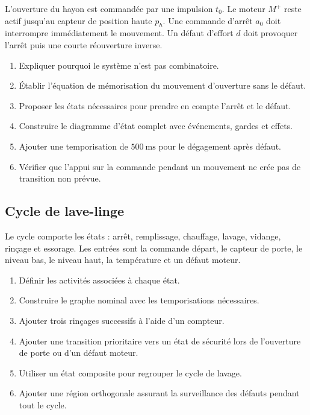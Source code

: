 L'ouverture du hayon est commandée par une impulsion $t_0$. Le moteur $M^+$ reste actif jusqu'au capteur de position haute $p_h$. Une commande d'arrêt $a_0$ doit interrompre immédiatement le mouvement. Un défaut d'effort $d$ doit provoquer l'arrêt puis une courte réouverture inverse.

\begin{enumerate}
  \item Expliquer pourquoi le système n'est pas combinatoire.
  \item Établir l'équation de mémorisation du mouvement d'ouverture sans le défaut.
  \item Proposer les états nécessaires pour prendre en compte l'arrêt et le défaut.
  \item Construire le diagramme d'état complet avec événements, gardes et effets.
  \item Ajouter une temporisation de $500\ \mathrm{ms}$ pour le dégagement après défaut.
  \item Vérifier que l'appui sur la commande pendant un mouvement ne crée pas de transition non prévue.
\end{enumerate}

\subsection{Cycle de lave-linge}

Le cycle comporte les états : arrêt, remplissage, chauffage, lavage, vidange, rinçage et essorage. Les entrées sont la commande départ, le capteur de porte, le niveau bas, le niveau haut, la température et un défaut moteur.

\begin{enumerate}
  \item Définir les activités associées à chaque état.
  \item Construire le graphe nominal avec les temporisations nécessaires.
  \item Ajouter trois rinçages successifs à l'aide d'un compteur.
  \item Ajouter une transition prioritaire vers un état de sécurité lors de l'ouverture de porte ou d'un défaut moteur.
  \item Utiliser un état composite pour regrouper le cycle de lavage.
  \item Ajouter une région orthogonale assurant la surveillance des défauts pendant tout le cycle.
\end{enumerate}

